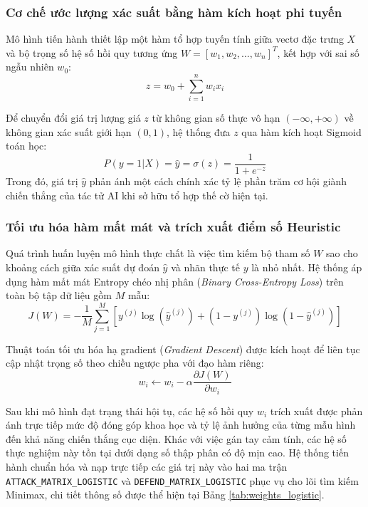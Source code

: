 \subsubsection{Cơ chế ước lượng xác suất bằng hàm kích hoạt phi tuyến}
Mô hình tiến hành thiết lập một hàm tổ hợp tuyến tính giữa vectơ đặc trưng $X$ và bộ trọng số hệ số hồi quy tương ứng $W = [w_1, w_2, \dots, w_n]^T$, kết hợp với sai số ngẫu nhiên $w_0$:
\begin{equation}
	z = w_0 + \sum_{i=1}^{n} w_i x_i
\end{equation}

Để chuyển đổi giá trị lượng giá $z$ từ không gian số thực vô hạn $(-\infty, +\infty)$ về không gian xác suất giới hạn $(0, 1)$, hệ thống đưa $z$ qua hàm kích hoạt Sigmoid toán học:
\begin{equation}
	P(y=1|X) = \hat{y} = \sigma(z) = \frac{1}{1 + e^{-z}}
\end{equation}
Trong đó, giá trị $\hat{y}$ phản ánh một cách chính xác tỷ lệ phần trăm cơ hội giành chiến thắng của tác tử AI khi sở hữu tổ hợp thế cờ hiện tại.

\subsubsection{Tối ưu hóa hàm mất mát và trích xuất điểm số Heuristic}
Quá trình huấn luyện mô hình thực chất là việc tìm kiếm bộ tham số $W$ sao cho khoảng cách giữa xác suất dự đoán $\hat{y}$ và nhãn thực tế $y$ là nhỏ nhất. Hệ thống áp dụng hàm mất mát Entropy chéo nhị phân (\textit{Binary Cross-Entropy Loss}) trên toàn bộ tập dữ liệu gồm $M$ mẫu:
\begin{equation}
	J(W) = -\frac{1}{M} \sum_{j=1}^{M} \left[ y^{(j)} \log(\hat{y}^{(j)}) + (1 - y^{(j)}) \log(1 - \hat{y}^{(j)}) \right]
\end{equation}

Thuật toán tối ưu hóa hạ gradient (\textit{Gradient Descent}) được kích hoạt để liên tục cập nhật trọng số theo chiều ngược pha với đạo hàm riêng:
\begin{equation}
	w_i \leftarrow w_i - \alpha \frac{\partial J(W)}{\partial w_i}
\end{equation}

Sau khi mô hình đạt trạng thái hội tụ, các hệ số hồi quy $w_i$ trích xuất được phản ánh trực tiếp mức độ đóng góp khoa học và tỷ lệ ảnh hưởng của từng mẫu hình đến khả năng chiến thắng cục diện. Khác với việc gán tay cảm tính, các hệ số thực nghiệm này tồn tại dưới dạng số thập phân có độ mịn cao. Hệ thống tiến hành chuẩn hóa và nạp trực tiếp các giá trị này vào hai ma trận \texttt{ATTACK\_MATRIX\_LOGISTIC} và \texttt{DEFEND\_MATRIX\_LOGISTIC} phục vụ cho lõi tìm kiếm Minimax, chi tiết thông số được thể hiện tại Bảng \ref{tab:weights_logistic}.

